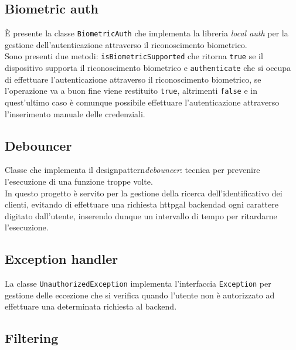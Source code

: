 \subsection{Biometric auth}
\label{subsec:biometric-auth}

È presente la classe \lstinline{BiometricAuth} che implementa la libreria \emph{local auth}\cite{site:local-auth} per la gestione dell'autenticazione attraverso il riconoscimento biometrico. \\
Sono presenti due metodi: \lstinline{isBiometricSupported} che ritorna \lstinline{true} se il dispositivo supporta il riconoscimento biometrico e \lstinline{authenticate} che si occupa di effettuare l'autenticazione attraverso il riconoscimento biometrico, se l'operazione va a buon fine viene restituito \lstinline{true}, altrimenti \lstinline{false} e in quest'ultimo caso è comunque possibile effettuare l'autenticazione attraverso l'inserimento manuale delle credenziali.

\subsection{Debouncer}
\label{subsec:debouncer}

Classe che implementa il \gls{designpattern}\glsoccur \emph{debouncer}: tecnica per prevenire l'esecuzione di una funzione troppe volte. \\
In questo progetto è servito per la gestione della ricerca dell'identificativo dei clienti, evitando di effettuare una richiesta \gls{httpg}\glsoccur al \gls{backend}\glsoccur ad ogni carattere digitato dall'utente, inserendo dunque un intervallo di tempo per ritardarne l'esecuzione.

\subsection{Exception handler}
\label{subsec:exception-handler}

La classe \lstinline{UnauthorizedException} implementa l'interfaccia \lstinline{Exception}\cite{site:exception} per gestione delle eccezione che si verifica quando l'utente non è autorizzato ad effettuare una determinata richiesta al \gls{backend}\glsoccur. 

\subsection{Filtering}
\label{subsec:filtering}

